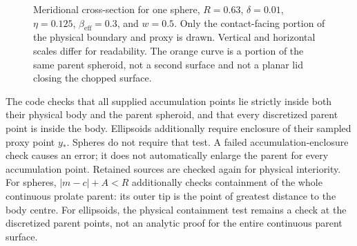 \documentclass[11pt,a4paper]{article}
\begin{document}
\begin{figure}[ht]
\centering
{}
\caption{Meridional cross-section for one sphere, $R=0.63$, $\delta=0.01$,
 $\eta=0.125$, $\beta_{\mathrm{eff}}=0.3$, and $w=0.5$.
 Only the contact-facing portion of the physical boundary and proxy is drawn.
 Vertical and horizontal scales differ for readability.
 The orange curve is a portion of the same parent spheroid, not a second
 surface and not a planar lid closing the chopped surface.}
\end{figure}

The code checks that all supplied accumulation points lie strictly inside
both their physical body and the parent spheroid, and that every discretized
parent point is inside the body.  Ellipsoids additionally require enclosure
of their sampled proxy point $y_*$.  Spheres do not require that test.  A failed
accumulation-enclosure check causes an error; it does not automatically
enlarge the parent for every accumulation point.  Retained sources are checked
again for physical interiority.  For spheres, $|m-c|+A<R$ additionally checks
containment of the whole continuous prolate parent: its outer tip is the point
of greatest distance to the body centre.  For ellipsoids, the physical
containment test remains a check at the discretized parent points, not an
analytic proof for the entire continuous parent surface.
\end{document}
